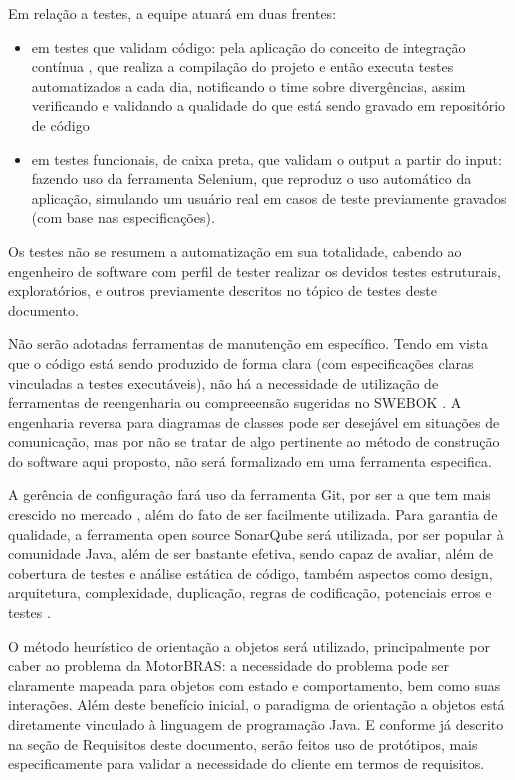 \documentclass[12pt,journal,compsoc]{IEEEtran}
\begin{document}
Em relação a testes, a equipe atuará em duas frentes: 
\begin{itemize}
\item em testes que validam código: pela aplicação do conceito de integração contínua \cite{ci_fowler}, que realiza a compilação do projeto e então executa testes automatizados a cada dia, notificando o time sobre divergências, assim verificando e validando a qualidade do que está sendo gravado em repositório de código
\item em testes funcionais, de caixa preta, que validam o output a partir do input: fazendo uso da ferramenta Selenium, que reproduz o uso automático da aplicação, simulando um usuário real em casos de teste previamente gravados (com base nas especificações). 
\end{itemize}

Os testes não se resumem a automatização em sua totalidade, cabendo ao engenheiro de software com perfil de tester realizar os devidos testes estruturais, exploratórios, e outros previamente descritos no tópico de testes deste documento.

Não serão adotadas ferramentas de manutenção em específico. Tendo em vista que o código está sendo produzido de forma clara (com especificações claras vinculadas a testes executáveis), não há a necessidade de utilização de ferramentas de reengenharia ou compreeensão sugeridas no SWEBOK \cite{society_software_2004}. A engenharia reversa para diagramas de classes pode ser desejável em situações de comunicação, mas por não se tratar de algo pertinente ao método de construção do software aqui proposto, não será formalizado em uma ferramenta especifica.

A gerência de configuração fará uso da ferramenta Git, por ser a que tem mais crescido no mercado \cite{scm_ranking}, além do fato de ser facilmente utilizada. Para garantia de qualidade, a ferramenta open source SonarQube será utilizada, por ser popular à comunidade Java, além de ser bastante efetiva, sendo capaz de avaliar, além de cobertura de testes e análise estática de código, também aspectos como design, arquitetura, complexidade, duplicação, regras de codificação, potenciais erros e testes \cite{quality_java_2010}.   

O método heurístico de orientação a objetos será utilizado, principalmente por caber ao problema da MotorBRAS: a necessidade do problema pode ser claramente mapeada para objetos com estado e comportamento, bem como suas interações. Além deste benefício inicial, o paradigma de orientação a objetos está diretamente vinculado à linguagem de programação Java. E conforme já descrito na seção de Requisitos deste documento, serão feitos uso de protótipos, mais especificamente para validar a necessidade do cliente em termos de requisitos.  
\end{document}

